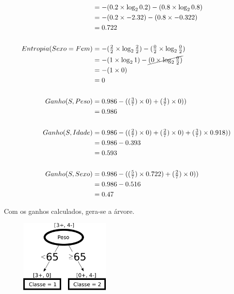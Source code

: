 \documentclass[
    article,            %
    11pt,               %
    oneside,            %
    a4paper,            %
    english,            %
    brazil,             %
    sumario=tradicional,
    ]{abntex2}
\begin{document}
\begin{align*}
            &= - (0.2 \times \log_2 0.2) - (0.8 \times \log_2 0.8)                             \\
            &= - (0.2 \times -2.32) - (0.8 \times -0.322)                                         \\
            &= 0.722                                                                                  \\\\
Entropia(Sexo = Fem) &= - (\tfrac{2}{2} \times \log_2 \tfrac{2}{2}) - (\tfrac{0}{2} \times \log_2 \tfrac{0}{2}) \\ 
            &= - (1 \times \log_2 1) - \cancel{(0 \times \log_2 \tfrac{0}{2})}                         \\
            &= - (1 \times 0)                                                                          \\
            &= 0      \\\\                                                                               
Ganho(S, Peso)  &= 0.986 - ((\tfrac{3}{7}) \times 0) + (\tfrac{4}{7}) \times 0))      \\ 
                &= 0.986                                                            \\\\
Ganho(S, Idade) &= 0.986 - ((\tfrac{2}{7}) \times 0) + (\tfrac{2}{7}) \times 0) + (\tfrac{3}{7}) \times 0.918))      \\ 
                &= 0.986 - 0.393 \\
                &= 0.593           \\\\                                                
Ganho(S, Sexo)  &= 0.986 - ((\tfrac{5}{7}) \times 0.722) + (\tfrac{2}{7}) \times 0))  \\
                &= 0.986 - 0.516 \\
                &= 0.47
\end{align*}

Com os ganhos calculados, gera-se a árvore.

\begin{figure}[H]
    \centering
    \includegraphics[width=0.4\textwidth]{imgs/slides2-tree.pdf}
\end{figure}
\end{document}
